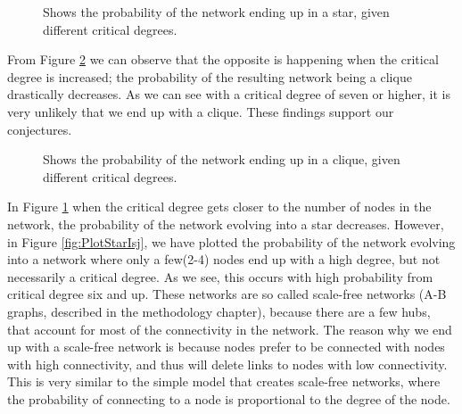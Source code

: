 \begin{figure}
\centering
{}
\caption{\label{fig:PlotStar} Shows the probability of the network ending up in a star, given different critical degrees.}
\end{figure}

From Figure \ref{fig:PlotClique} we can observe that the opposite is happening when the critical degree is increased; the probability of the resulting network being a clique drastically decreases. As we can see with a critical degree of seven or higher, it is very unlikely that we end up with a clique. These findings support our conjectures.

\begin{figure}
\centering
{}
\caption{\label{fig:PlotClique} Shows the probability of the network ending up in a clique, given different critical degrees.}
\end{figure}

In Figure \ref{fig:PlotStar} when the critical degree gets closer to the number of nodes in the network, the probability of the network evolving into a star decreases. However, in Figure \ref{fig:PlotStarIsj}, we have plotted the probability of the network evolving into a network where only a few(2-4) nodes end up with a high degree, but not necessarily a critical degree. As we see, this occurs with high probability from critical degree six and up. These networks are so called scale-free networks (A-B graphs, described in the methodology chapter), because there are a few hubs, that account for most of the connectivity in the network. The reason why we end up with a scale-free network is because nodes prefer to be connected with nodes with high connectivity, and thus will delete links to nodes with low connectivity. This is very similar to the simple model that creates scale-free networks, where the probability of connecting to a node is proportional to the degree of the node.


